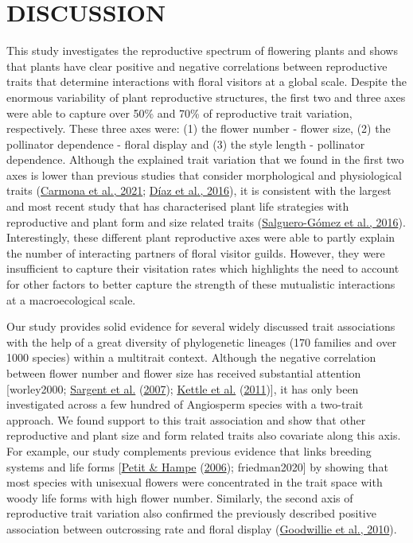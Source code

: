 \documentclass[
  12pt,
  a4paper,
]{article}
\begin{document}
\hypertarget{discussion}{%
\section{DISCUSSION}\label{discussion}}

This study investigates the reproductive spectrum of flowering plants and shows that plants have clear positive and negative correlations between reproductive traits that determine interactions with floral visitors at a global scale. Despite the enormous variability of plant reproductive structures, the first two and three axes were able to capture over 50\% and 70\% of reproductive trait variation, respectively. These three axes were: (1) the flower number - flower size, (2) the pollinator dependence - floral display and (3) the style length - pollinator dependence. Although the explained trait variation that we found in the first two axes is lower than previous studies that consider morphological and physiological traits (\protect\hyperlink{ref-carmona2021}{Carmona et al., 2021}; \protect\hyperlink{ref-diaz2016}{Díaz et al., 2016}), it is consistent with the largest and most recent study that has characterised plant life strategies with reproductive and plant form and size related traits (\protect\hyperlink{ref-salguero2016}{Salguero-Gómez et al., 2016}). Interestingly, these different plant reproductive axes were able to partly explain the number of interacting partners of floral visitor guilds. However, they were insufficient to capture their visitation rates which highlights the need to account for other factors to better capture the strength of these mutualistic interactions at a macroecological scale.

Our study provides solid evidence for several widely discussed trait associations with the help of a great diversity of phylogenetic lineages (170 families and over 1000 species) within a multitrait context. Although the negative correlation between flower number and flower size has received substantial attention {[}worley2000; \protect\hyperlink{ref-sargent2007}{Sargent et al.} (\protect\hyperlink{ref-sargent2007}{2007}); \protect\hyperlink{ref-kettle2011}{Kettle et al.} (\protect\hyperlink{ref-kettle2011}{2011}){]}, it has only been investigated across a few hundred of Angiosperm species with a two-trait approach. We found support to this trait association and show that other reproductive and plant size and form related traits also covariate along this axis. For example, our study complements previous evidence that links breeding systems and life forms {[}\protect\hyperlink{ref-petit2006}{Petit \& Hampe} (\protect\hyperlink{ref-petit2006}{2006}); friedman2020{]} by showing that most species with unisexual flowers were concentrated in the trait space with woody life forms with high flower number. Similarly, the second axis of reproductive trait variation also confirmed the previously described positive association between outcrossing rate and floral display (\protect\hyperlink{ref-goodwillie2010}{Goodwillie et al., 2010}).
\end{document}
